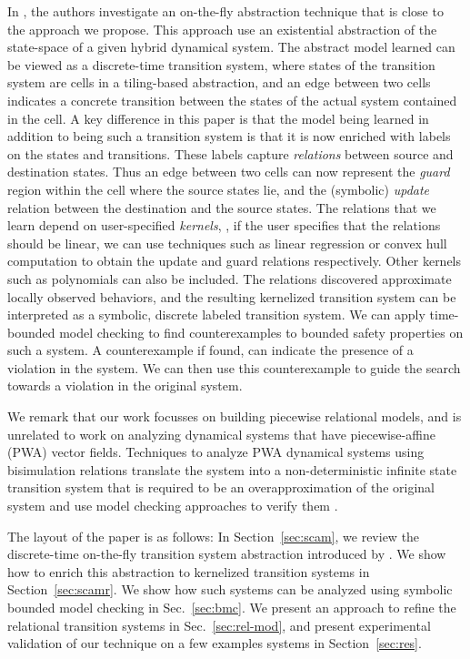 In \cite{zutshi2014multiple}, the authors investigate an on-the-fly
abstraction technique that is close to the approach we propose.  This
approach use an existential abstraction of the state-space of a given
hybrid dynamical system. The abstract model learned can be viewed as a
discrete-time transition system, where states of the transition system
are cells in a tiling-based abstraction, and an edge between two cells
indicates a concrete transition between the states of the actual
system contained in the cell.  A key difference in this paper is that
the model being learned in addition to being such a transition system
is that it is now enriched with labels on the states and transitions.
These labels capture {\em relations} between source and destination
states. Thus an edge between two cells can now represent the {\em
guard} region within the cell where the source states lie, and the
(symbolic) {\em update} relation between the destination and the
source states.  The relations that we learn depend on user-specified
{\em kernels}, \ie, if the user specifies that the relations should be
linear, we can use techniques such as linear regression or convex hull
computation to obtain the update and guard relations respectively.
Other kernels such as polynomials can also be included.  The relations
discovered approximate locally observed behaviors, and the resulting
kernelized transition system can be interpreted as a symbolic,
discrete labeled transition system. We can apply time-bounded model
checking to find counterexamples to bounded safety properties on such
a system. A counterexample if found, can indicate the presence of a
violation in the system.  We can then use this counterexample to guide
the search towards a violation in the original system. 

We remark that our work focusses on building piecewise relational
models, and is unrelated to work on analyzing dynamical systems that
have piecewise-affine (PWA) vector fields. Techniques to analyze PWA
dynamical systems using bisimulation relations translate the system
into a non-deterministic infinite state transition system that is
required to be an overapproximation of the original system and use
model checking approaches to verify them \cite{asarin2000approximate}.


The layout of the paper is as follows: In Section~\ref{sec:scam}, we
review the discrete-time on-the-fly transition system abstraction
introduced by \cite{zutshi2014multiple}.  We show how to enrich this
abstraction to kernelized transition systems in
Section~\ref{sec:scamr}.  We show how such systems can be analyzed
using symbolic bounded model checking in Sec.~\ref{sec:bmc}.  We
present an approach to refine the relational transition systems in
Sec.~\ref{sec:rel-mod}, and present experimental validation of our
technique on a few examples systems in Section~\ref{sec:res}.
